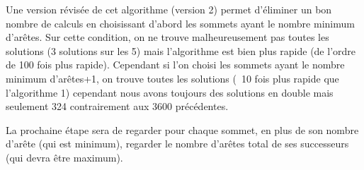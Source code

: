 \documentclass[10pt,a4paper]{article}
\begin{document}
Une version révisée de cet algorithme (version 2) permet d'éliminer un bon nombre de calculs en choisissant d'abord les sommets ayant le nombre minimum d'arêtes. Sur cette condition, on ne trouve malheureusement pas toutes les solutions (3 solutions sur les 5) mais l'algorithme est bien plus rapide (de l'ordre de 100 fois plus rapide). Cependant si l'on choisi les sommets ayant le nombre minimum d'arêtes+1, on trouve toutes les solutions (~10 fois plus rapide que l'algorithme 1) cependant nous avons toujours des solutions en double mais seulement 324 contrairement aux 3600 précédentes.

La prochaine étape sera de regarder pour chaque sommet, en plus de son nombre d'arête (qui est minimum), regarder le nombre d'arêtes total de ses successeurs (qui devra être maximum).
\end{document}
